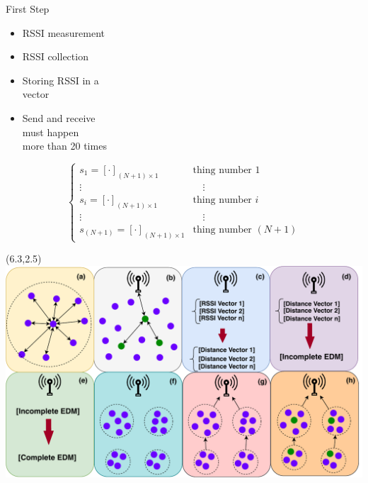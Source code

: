\documentclass{beamer}
\begin{document}
\begin{frame}[t]{First Step} %

\begin{itemize}

\item RSSI measurement

\item RSSI collection

\item Storing RSSI in a \\ vector

\item Send and receive \\ must happen \\ more than 20 times

\end{itemize}

\begin{equation}
        \left\{ \begin{array}{ll}
    		s_{1}=[\cdot]_{(N+1)\times1}     & \textrm{thing number $1$}\\
    	    \vdots                            &\quad \vdots \\
    		s_{i}=[\cdot]_{(N+1)\times1}   & \textrm{thing number $i$}\\
    	    \vdots                            &\quad \vdots \\
    		s_{(N+1)}=[\cdot]_{(N+1)\times1}   & \textrm{thing number $(N+1)$}
        \end{array} \right.
\end{equation}

\begin{textblock}{0.8}(6.3,2.5)
\includegraphics[scale=0.35]{figure/Steps.pdf}
\end{textblock}
\end{frame}
\end{document}
